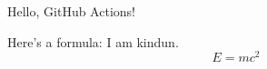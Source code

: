 \documentclass{article}
\begin{document}
Hello, GitHub Actions!

Here's a formula:
I am kindun.
\[
E = mc^2
\]
\end{document}
